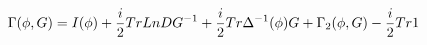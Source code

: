 \begin{equation}
\label{due}
\Gamma (\phi , G) ={ I(\phi) +{ i \over 2} Tr Ln {D G^{-1}} +{i \over 2} Tr {\Delta ^{-1}(\phi) G} + \Gamma_{2}(\phi, G)-{i \over 2} Tr1}
\end{equation}

